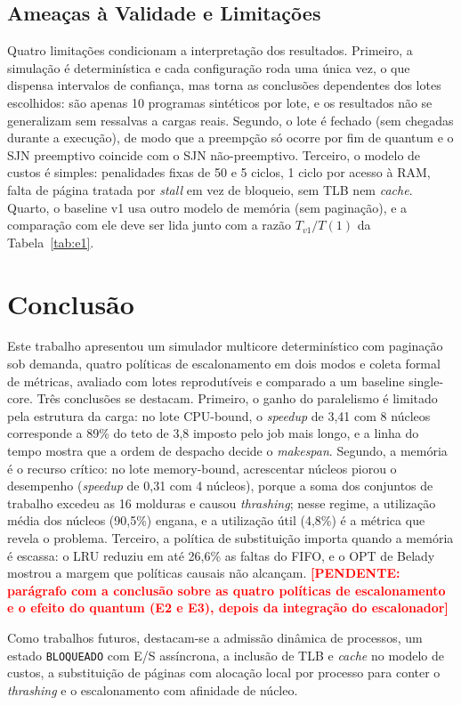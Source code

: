 \documentclass[conference]{IEEEtran}
\newcommand{\pendente}[1]{\textcolor{red}{\textbf{[PENDENTE: #1]}}}
\begin{document}
\subsection{Ameaças à Validade e Limitações}
Quatro limitações condicionam a interpretação dos resultados. Primeiro, a simulação é determinística e cada configuração roda uma única vez, o que dispensa intervalos de confiança, mas torna as conclusões dependentes dos lotes escolhidos: são apenas 10 programas sintéticos por lote, e os resultados não se generalizam sem ressalvas a cargas reais. Segundo, o lote é fechado (sem chegadas durante a execução), de modo que a preempção só ocorre por fim de quantum e o SJN preemptivo coincide com o SJN não-preemptivo. Terceiro, o modelo de custos é simples: penalidades fixas de 50 e 5 ciclos, 1 ciclo por acesso à RAM, falta de página tratada por \textit{stall} em vez de bloqueio, sem TLB nem \textit{cache}. Quarto, o baseline v1 usa outro modelo de memória (sem paginação), e a comparação com ele deve ser lida junto com a razão $T_{v1}/T(1)$ da Tabela~\ref{tab:e1}.

\section{Conclusão}
\label{sec:conc}
Este trabalho apresentou um simulador multicore determinístico com paginação sob demanda, quatro políticas de escalonamento em dois modos e coleta formal de métricas, avaliado com lotes reprodutíveis e comparado a um baseline single-core. Três conclusões se destacam. Primeiro, o ganho do paralelismo é limitado pela estrutura da carga: no lote CPU-bound, o \textit{speedup} de 3,41 com 8 núcleos corresponde a 89\% do teto de 3,8 imposto pelo job mais longo, e a linha do tempo mostra que a ordem de despacho decide o \textit{makespan}. Segundo, a memória é o recurso crítico: no lote memory-bound, acrescentar núcleos piorou o desempenho (\textit{speedup} de 0,31 com 4 núcleos), porque a soma dos conjuntos de trabalho excedeu as 16 molduras e causou \textit{thrashing}; nesse regime, a utilização média dos núcleos (90,5\%) engana, e a utilização útil (4,8\%) é a métrica que revela o problema. Terceiro, a política de substituição importa quando a memória é escassa: o LRU reduziu em até 26,6\% as faltas do FIFO, e o OPT de Belady mostrou a margem que políticas causais não alcançam. \pendente{parágrafo com a conclusão sobre as quatro políticas de escalonamento e o efeito do quantum (E2 e E3), depois da integração do escalonador}

Como trabalhos futuros, destacam-se a admissão dinâmica de processos, um estado \texttt{BLOQUEADO} com E/S assíncrona, a inclusão de TLB e \textit{cache} no modelo de custos, a substituição de páginas com alocação local por processo para conter o \textit{thrashing} e o escalonamento com afinidade de núcleo.



\end{document}
